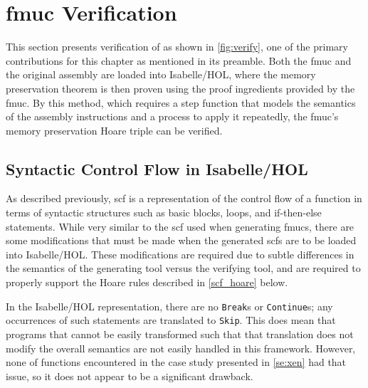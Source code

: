 \section{\acs*{fmuc} Verification}\label{se:fmuc_ver}
This section presents verification of  as shown in \cref{fig:verify},
one of the primary contributions for this chapter as mentioned in its preamble.
Both the \ac{fmuc} and the original assembly are loaded into Isabelle/HOL,
where the memory preservation theorem is then proven using the proof ingredients
provided by the \ac{fmuc}.
By this method, which requires a step function
that models the semantics of the assembly instructions
and a process to apply it repeatedly,
the \ac{fmuc}'s memory preservation Hoare triple can be verified.

\begin{figure*}
  \centering
  \caption{Overview of \acs*{fmuc} verification}\label{fig:verify}
\end{figure*}

\subsection{Syntactic Control Flow in Isabelle/HOL}\label{isabelle_scf}
As described previously, \acl{scf} is a representation of the control flow of a function
in terms of syntactic structures such as basic blocks,
loops, and if-then-else statements.
While very similar to the \ac{scf} used when generating \acp{fmuc},
there are some modifications that must be made when the generated \acp{scf}
are to be loaded into Isabelle/HOL.
These modifications are required due to subtle differences in the semantics
of the generating tool versus the verifying tool,
and are required to properly support the Hoare rules
described in \cref{scf_hoare} below.

In the Isabelle/HOL representation,
there are no \texttt{Break}s or \texttt{Continue}s;
any occurrences of such statements are translated to \texttt{Skip}.
This does mean that programs that cannot be easily transformed
such that that translation does not modify the overall semantics
are not easily handled in this framework.
However, none of functions encountered in the case study presented in \cref{se:xen}
had that issue, so it does not appear to be a significant drawback.

